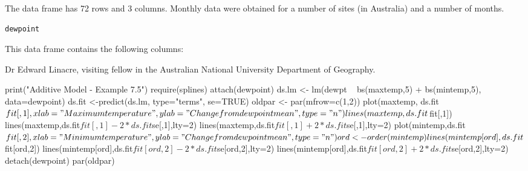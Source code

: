 \begin{Description}\relax
The  data frame has 72 rows and 3 columns.
Monthly data were obtained for a number of sites (in Australia)
and a number of months.
\end{Description}
\begin{Usage}
\begin{verbatim}dewpoint\end{verbatim}
\end{Usage}
\begin{Format}\relax
This data frame contains the following columns:
\end{Format}
\begin{Source}\relax
Dr Edward Linacre,
visiting fellow in the Australian National University Department
of Geography.
\end{Source}
\begin{Examples}
\begin{ExampleCode}
print("Additive Model - Example 7.5")
require(splines)
attach(dewpoint)   
ds.lm <- lm(dewpt ~ bs(maxtemp,5) + bs(mintemp,5), data=dewpoint)
ds.fit <-predict(ds.lm, type="terms", se=TRUE)
oldpar <- par(mfrow=c(1,2))
plot(maxtemp, ds.fit$fit[,1], xlab="Maximum temperature",
     ylab="Change from dewpoint mean",type="n")
lines(maxtemp,ds.fit$fit[,1])
lines(maxtemp,ds.fit$fit[,1]-2*ds.fit$se[,1],lty=2)
lines(maxtemp,ds.fit$fit[,1]+2*ds.fit$se[,1],lty=2)
plot(mintemp,ds.fit$fit[,2],xlab="Minimum temperature",
     ylab="Change from dewpoint mean",type="n")
ord<-order(mintemp)
lines(mintemp[ord],ds.fit$fit[ord,2])
lines(mintemp[ord],ds.fit$fit[ord,2]-2*ds.fit$se[ord,2],lty=2)
lines(mintemp[ord],ds.fit$fit[ord,2]+2*ds.fit$se[ord,2],lty=2)
detach(dewpoint)
par(oldpar)

\end{ExampleCode}
\end{Examples}

